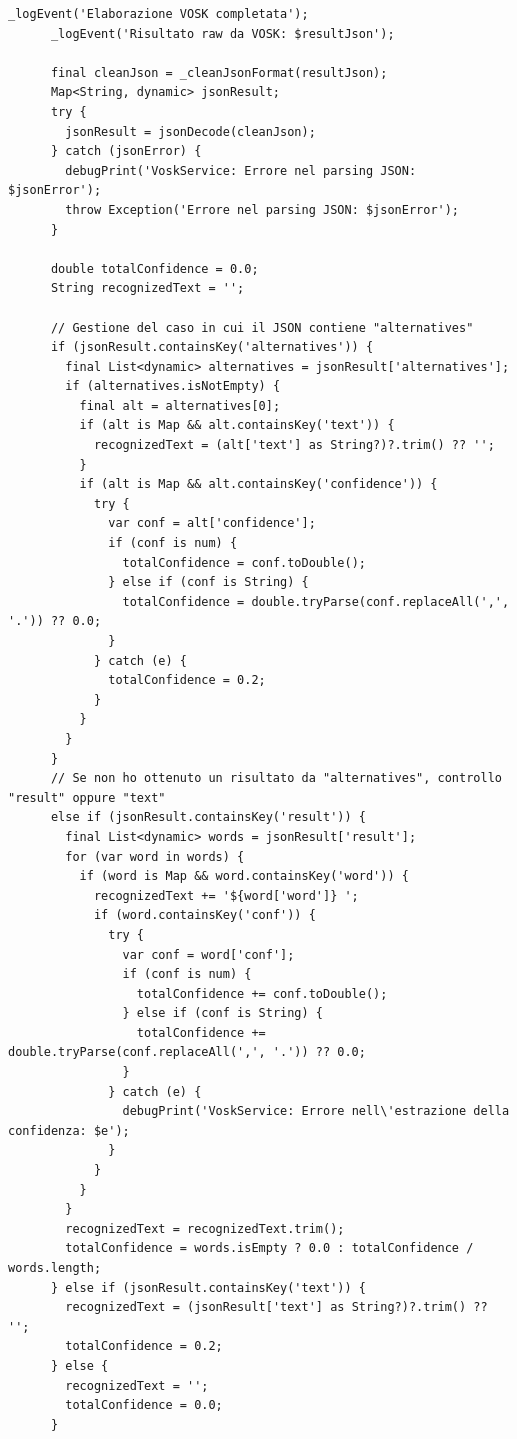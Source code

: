 \documentclass[14pt]{extbook}
\begin{document}
\begin{lstlisting}[caption=vosk\_service.dart, label=lst:VoskService]
      _logEvent('Elaborazione VOSK completata');
      _logEvent('Risultato raw da VOSK: $resultJson');

      final cleanJson = _cleanJsonFormat(resultJson);
      Map<String, dynamic> jsonResult;
      try {
        jsonResult = jsonDecode(cleanJson);
      } catch (jsonError) {
        debugPrint('VoskService: Errore nel parsing JSON: $jsonError');
        throw Exception('Errore nel parsing JSON: $jsonError');
      }

      double totalConfidence = 0.0;
      String recognizedText = '';

      // Gestione del caso in cui il JSON contiene "alternatives"
      if (jsonResult.containsKey('alternatives')) {
        final List<dynamic> alternatives = jsonResult['alternatives'];
        if (alternatives.isNotEmpty) {
          final alt = alternatives[0];
          if (alt is Map && alt.containsKey('text')) {
            recognizedText = (alt['text'] as String?)?.trim() ?? '';
          }
          if (alt is Map && alt.containsKey('confidence')) {
            try {
              var conf = alt['confidence'];
              if (conf is num) {
                totalConfidence = conf.toDouble();
              } else if (conf is String) {
                totalConfidence = double.tryParse(conf.replaceAll(',', '.')) ?? 0.0;
              }
            } catch (e) {
              totalConfidence = 0.2;
            }
          }
        }
      }
      // Se non ho ottenuto un risultato da "alternatives", controllo "result" oppure "text"
      else if (jsonResult.containsKey('result')) {
        final List<dynamic> words = jsonResult['result'];
        for (var word in words) {
          if (word is Map && word.containsKey('word')) {
            recognizedText += '${word['word']} ';
            if (word.containsKey('conf')) {
              try {
                var conf = word['conf'];
                if (conf is num) {
                  totalConfidence += conf.toDouble();
                } else if (conf is String) {
                  totalConfidence += double.tryParse(conf.replaceAll(',', '.')) ?? 0.0;
                }
              } catch (e) {
                debugPrint('VoskService: Errore nell\'estrazione della confidenza: $e');
              }
            }
          }
        }
        recognizedText = recognizedText.trim();
        totalConfidence = words.isEmpty ? 0.0 : totalConfidence / words.length;
      } else if (jsonResult.containsKey('text')) {
        recognizedText = (jsonResult['text'] as String?)?.trim() ?? '';
        totalConfidence = 0.2;
      } else {
        recognizedText = '';
        totalConfidence = 0.0;
      }


\end{lstlisting}
\end{document}
